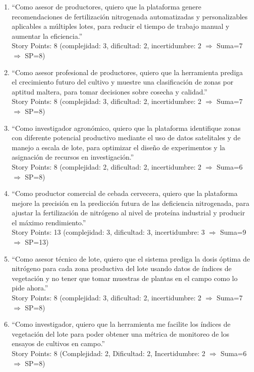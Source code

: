 \documentclass[
11pt, %
]{charter}
\begin{document}
\begin{enumerate}
    \item “Como asesor de productores, quiero que la plataforma genere recomendaciones de fertilización nitrogenada automatizadas y personalizables aplicables a múltiples lotes, para reducir el tiempo de trabajo manual y aumentar la eficiencia.”\\
    Story Points: 8 (complejidad: 3, dificultad: 2, incertidumbre: 2 $\Rightarrow$ Suma=7 $\Rightarrow$ SP=8)

    \item “Como asesor profesional de productores, quiero que la herramienta prediga el crecimiento futuro del cultivo y muestre una clasificación de zonas por aptitud maltera, para tomar decisiones sobre cosecha y calidad.”\\ 
    Story Points: 8 (complejidad: 3, dificultad: 2, incertidumbre: 2 $\Rightarrow$ Suma=7 $\Rightarrow$ SP=8)

    \item “Como investigador agronómico, quiero que la plataforma identifique zonas con diferente potencial productivo mediante el uso de datos satelitales y de manejo a escala de lote, para optimizar el diseño de experimentos y la asignación de recursos en investigación.”\\ 
    Story Points: 8 (complejidad: 2, dificultad: 2, incertidumbre: 2 $\Rightarrow$ Suma=6 $\Rightarrow$ SP=8)

    \item “Como productor comercial de cebada cervecera, quiero que la plataforma mejore la precisión en la predicción futura de las deficiencia nitrogenada, para ajustar la fertilización de nitrógeno al nivel de proteína industrial y producir el máximo rendimiento.”\\ %
    Story Points: 13 (complejidad: 3, dificultad: 3, incertidumbre: 3 $\Rightarrow$ Suma=9 $\Rightarrow$ SP=13)

    \item “Como asesor técnico de lote, quiero que el sistema prediga la dosis óptima de nitrógeno para cada zona productiva del lote usando datos de índices de vegetación y no tener que tomar muestras de plantas en el campo como lo pide ahora.”\\
    Story Points: 8 (complejidad: 3, dificultad: 2, incertidumbre: 2 $\Rightarrow$ Suma=7 $\Rightarrow$ SP=8)

    \item “Como investigador, quiero que la herramienta me facilite los índices de vegetación del lote para poder obtener una métrica de monitoreo de los ensayos de cultivos en campo.”\\ 
    Story Points: 8 (Complejidad: 2, Dificultad: 2, Incertidumbre: 2 $\Rightarrow$ Suma=6 $\Rightarrow$ SP=8)


\end{enumerate}
\end{document}
